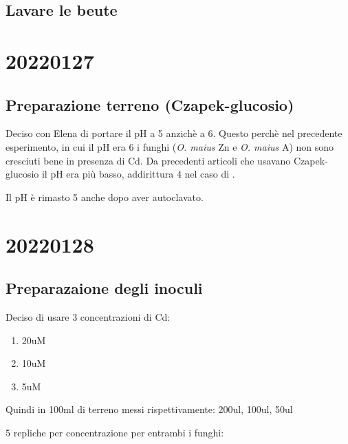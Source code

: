 \documentclass[
]{book}
\providecommand{\tightlist}{%
  \setlength{\itemsep}{0pt}\setlength{\parskip}{0pt}}
\begin{document}
\hypertarget{lavare-le-beute}{%
\subsection{Lavare le beute}\label{lavare-le-beute}}

\hypertarget{D20220127}{%
\section{20220127}\label{D20220127}}

\hypertarget{preparazione-terreno-czapek-glucosio}{%
\subsection{Preparazione terreno (Czapek-glucosio)}\label{preparazione-terreno-czapek-glucosio}}

Deciso con Elena di portare il pH a 5 anzichè a 6. Questo perchè nel precedente esperimento, in cui il pH era 6 i funghi (\emph{O. maius} Zn e \emph{O. maius} A) non sono cresciuti bene in presenza di Cd. Da precedenti articoli che usavano Czapek-glucosio il pH era più basso, addirittura 4 nel caso di \citep{KHOUJA20141}.

Il pH è rimasto 5 anche dopo aver autoclavato.

\hypertarget{D20220128}{%
\section{20220128}\label{D20220128}}

\hypertarget{preparazaione-degli-inoculi}{%
\subsection{Preparazaione degli inoculi}\label{preparazaione-degli-inoculi}}

Deciso di usare 3 concentrazioni di Cd:

\begin{enumerate}
\def\labelenumi{\arabic{enumi}.}
\tightlist
\item
  20uM\\
\item
  10uM\\
\item
  5uM
\end{enumerate}

Quindi in 100ml di terreno messi rispettivamente: 200ul, 100ul, 50ul

5 repliche per concentrazione per entrambi i funghi:
\end{document}
